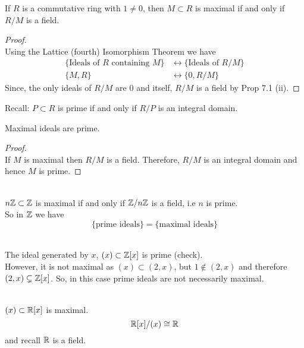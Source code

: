 \documentclass[../Main.tex]{subfiles}
\begin{document}
\begin{thm}[title = \texorpdfstring{$M$}{M} maximal in comm. \texorpdfstring{$R \Longleftrightarrow R/M$}{R iff R/M} is field]
	If $R$ is a commutative ring with $1\ne 0$, then $M\subset R$ is maximal if and only if $R/M$ is a field.
\end{thm}

\begin{proof}~\\
	Using the Lattice (fourth) Isomorphism Theorem  we have
	\begin{align*}
	\{\text{Ideals of } R \text{ containing } M \} &\longleftrightarrow \{\text{Ideals of } R/M\}\\
	\{M,R\} &\longleftrightarrow \{0, R/M\}
	\end{align*}
	Since, the only ideals of $R/M$ are $0$ and itself, $R/M$ is a field by Prop 7.1 (ii).
\end{proof}
Recall: $P\subset R$ is prime if and only if $R/P$ is an integral domain.
\begin{crl}[title= Maximal ideals are prime]
	Maximal ideals are prime.
\end{crl}
\begin{proof}~\\
	If $M$ is maximal then $R/M$ is a field. Therefore, $R/M$ is an integral domain and hence $M$ is prime.
\end{proof}
\begin{example}~\\
	$n\mathbb{Z}\subset \mathbb{Z}$ is maximal if and only if $\mathbb{Z}/n\mathbb{Z}$ is a field, i.e $n$ is prime.\\
	So in $\mathbb{Z}$ we have
	\[\{\text{prime ideals}\} =\{\text{maximal ideals}\} \]
\end{example}
\begin{example}~\\
	The ideal generated by $x$, $(x) \subset \mathbb{Z}[x]$ is prime (check).\\
	However, it is not maximal as $(x) \subset (2,x)$, but $1\notin (2,x)$ and therefore $(2,x) \subsetneq \mathbb{Z}[x]$.
	So, in this case prime ideals are not necessarily maximal.
\end{example}
\begin{example}~\\
	$(x)\subset \mathbb{R}[x]$ is maximal.
	\[\mathbb{R}[x]/(x) \cong \mathbb{R}\]
	and recall $\mathbb{R}$ is a field.
\end{example}
\end{document}
